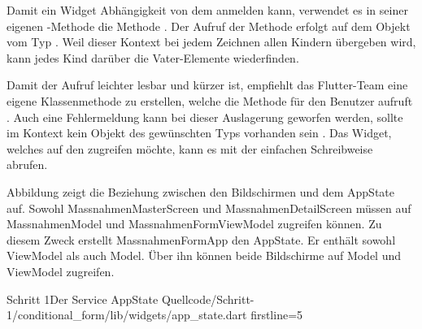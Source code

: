 Damit ein Widget Abhängigkeit von dem  anmelden kann, verwendet es in seiner eigenen -Methode die Methode . Der Aufruf der Methode erfolgt auf dem Objekt vom Typ . Weil dieser Kontext bei jedem Zeichnen allen Kindern übergeben wird, kann jedes Kind darüber die Vater-Elemente wiederfinden.

Damit der Aufruf leichter lesbar und kürzer ist, empfiehlt das Flutter-Team eine eigene Klassenmethode zu erstellen, welche die Methode für den Benutzer aufruft . Auch eine Fehlermeldung kann bei dieser Auslagerung geworfen werden, sollte im Kontext kein Objekt des gewünschten Typs vorhanden sein . Das Widget, welches auf den  zugreifen möchte, kann es mit der einfachen Schreibweise  abrufen.

Abbildung \label{lst:UmlAppState} zeigt die Beziehung zwischen den Bildschirmen und dem AppState auf. Sowohl MassnahmenMasterScreen und MassnahmenDetailScreen müssen auf MassnahmenModel und MassnahmenFormViewModel zugreifen können. Zu diesem Zweck erstellt MassnahmenFormApp den AppState. Er enthält sowohl ViewModel als auch Model. Über ihn können beide Bildschirme auf Model und ViewModel zugreifen. 


\begin{alexlisting}{Schritt 1}{Der Service AppState}
  {Quellcode/Schritt-1/conditional_form/lib/widgets/app_state.dart}
  {firstline=5}
  \label{lst:Schritt1DerServiceAppState}
\end{alexlisting}


